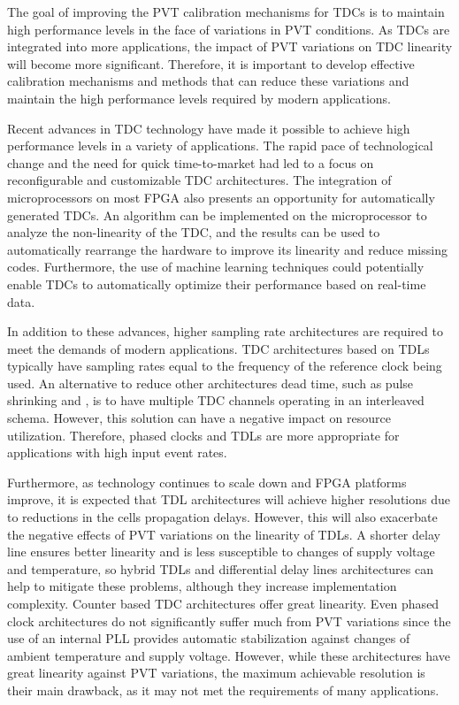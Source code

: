
The goal of improving the \gls{PVT} calibration mechanisms for \glspl{TDC} is to maintain high performance levels in the face of variations in \gls{PVT} conditions. As \glspl{TDC} are integrated into more applications, the impact of \gls{PVT} variations on \gls{TDC} linearity will become more significant. Therefore, it is important to develop effective calibration mechanisms and methods that can reduce these variations and maintain the high performance levels required by modern applications.

Recent advances in \gls{TDC} technology have made it possible to achieve high performance levels in a variety of applications. The rapid pace of technological change and the need for quick time-to-market had led to a focus on reconfigurable and customizable \gls{TDC} architectures. The integration of microprocessors on most \gls{FPGA} also presents an opportunity for automatically generated \glspl{TDC}. An algorithm can be implemented on the microprocessor to analyze the non-linearity of the \gls{TDC}, and the results can be used to automatically rearrange the hardware to improve its linearity and reduce missing codes. Furthermore, the use of machine learning techniques could potentially enable \glspl{TDC} to automatically optimize their performance based on real-time data.

In addition to these advances, higher sampling rate architectures are required to meet the demands of modern applications. \gls{TDC} architectures based on \glspl{TDL} typically have sampling rates equal to the frequency of the reference clock being used. An alternative to reduce other architectures dead time, such as pulse shrinking and , is to have multiple \gls{TDC} channels operating in an interleaved schema. However, this solution can have a negative impact on resource utilization. Therefore, phased clocks and \glspl{TDL} are more appropriate for applications with high input event rates.

Furthermore, as technology continues to scale down and \gls{FPGA} platforms improve, it is expected that \gls{TDL} architectures will achieve higher resolutions due to reductions in the cells propagation delays. However, this will also exacerbate the negative effects of \gls{PVT} variations on the linearity of \glspl{TDL}. A shorter delay line ensures better linearity and is less susceptible to changes of supply voltage and temperature, so hybrid \glspl{TDL} and differential delay lines architectures can help to mitigate these problems, although they increase implementation complexity. Counter based \gls{TDC} architectures offer great linearity. Even phased clock architectures do not significantly suffer much from \gls{PVT} variations since the use of an internal \gls{PLL} provides automatic stabilization against changes of ambient temperature and supply voltage. However, while these architectures have great linearity against \gls{PVT} variations, the maximum achievable resolution is their main drawback, as it may not met the requirements of many applications.

